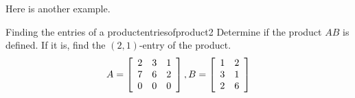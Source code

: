 Here is another example.

\begin{example}{Finding the entries of a product}{entriesofproduct2}
Determine if the product $AB$ is defined. If it is, find the $\left( 2, 1 \right)$-entry of the product.
\begin{equation*}
A=
\left[
\begin{array}{rrr}
2 & 3 & 1 \\
7 & 6 & 2 \\
0 & 0 & 0
\end{array}
\right],  B =\left[
\begin{array}{rr}
1 & 2 \\
3 & 1 \\
2 & 6
\end{array}
\right] 
\end{equation*}
\end{example}

